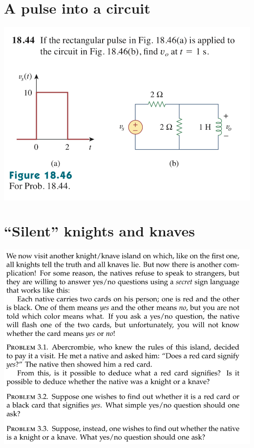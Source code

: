 \documentclass[11pt]{book}
\begin{document}
\section{A pulse into a circuit}
\begin{center}
	\includegraphics[width=\textwidth]{figures/q3.37.png} 
\end{center}

\newpage

\section{``Silent'' knights and knaves}
\begin{center}
	\includegraphics[width=\textwidth]{figures/q3.19.png}
\end{center}
\end{document}
